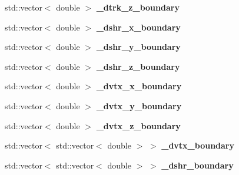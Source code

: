 \begin{DoxyCompactItemize}
\item 
std\+::vector$<$ double $>$ {\bfseries \+\_\+dtrk\+\_\+z\+\_\+boundary}\hypertarget{classanalysis_1_1ContainmentAnalysis_a833a1aaeb93bec0a73ff59f25dcdcba9}{}\label{classanalysis_1_1ContainmentAnalysis_a833a1aaeb93bec0a73ff59f25dcdcba9}

\item 
std\+::vector$<$ double $>$ {\bfseries \+\_\+dshr\+\_\+x\+\_\+boundary}\hypertarget{classanalysis_1_1ContainmentAnalysis_a36e81065e3d4ea6884227063ce5047b4}{}\label{classanalysis_1_1ContainmentAnalysis_a36e81065e3d4ea6884227063ce5047b4}

\item 
std\+::vector$<$ double $>$ {\bfseries \+\_\+dshr\+\_\+y\+\_\+boundary}\hypertarget{classanalysis_1_1ContainmentAnalysis_ae623b7efd1d545fbe9d32bafac77718d}{}\label{classanalysis_1_1ContainmentAnalysis_ae623b7efd1d545fbe9d32bafac77718d}

\item 
std\+::vector$<$ double $>$ {\bfseries \+\_\+dshr\+\_\+z\+\_\+boundary}\hypertarget{classanalysis_1_1ContainmentAnalysis_ac45217df52482cc670b0ea4bd86c8257}{}\label{classanalysis_1_1ContainmentAnalysis_ac45217df52482cc670b0ea4bd86c8257}

\item 
std\+::vector$<$ double $>$ {\bfseries \+\_\+dvtx\+\_\+x\+\_\+boundary}\hypertarget{classanalysis_1_1ContainmentAnalysis_af20b04910d32f51b8ade5f0bb6558e35}{}\label{classanalysis_1_1ContainmentAnalysis_af20b04910d32f51b8ade5f0bb6558e35}

\item 
std\+::vector$<$ double $>$ {\bfseries \+\_\+dvtx\+\_\+y\+\_\+boundary}\hypertarget{classanalysis_1_1ContainmentAnalysis_ab2894eefd881547b87ed6c932b08c4df}{}\label{classanalysis_1_1ContainmentAnalysis_ab2894eefd881547b87ed6c932b08c4df}

\item 
std\+::vector$<$ double $>$ {\bfseries \+\_\+dvtx\+\_\+z\+\_\+boundary}\hypertarget{classanalysis_1_1ContainmentAnalysis_a7216bd74951faf0862964a2d41c4c280}{}\label{classanalysis_1_1ContainmentAnalysis_a7216bd74951faf0862964a2d41c4c280}

\item 
std\+::vector$<$ std\+::vector$<$ double $>$ $>$ {\bfseries \+\_\+dvtx\+\_\+boundary}\hypertarget{classanalysis_1_1ContainmentAnalysis_a063ed2f268f5c58f7823296b9aafbbe7}{}\label{classanalysis_1_1ContainmentAnalysis_a063ed2f268f5c58f7823296b9aafbbe7}

\item 
std\+::vector$<$ std\+::vector$<$ double $>$ $>$ {\bfseries \+\_\+dshr\+\_\+boundary}\hypertarget{classanalysis_1_1ContainmentAnalysis_a67f8f6bc60848aaa130169bc7be0d4e2}{}\label{classanalysis_1_1ContainmentAnalysis_a67f8f6bc60848aaa130169bc7be0d4e2}

\end{DoxyCompactItemize}


